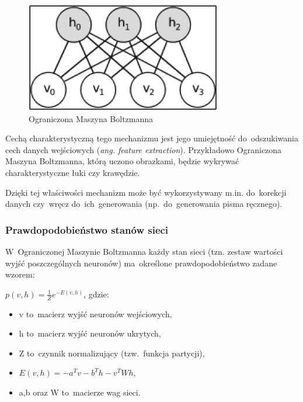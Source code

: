 \begin{figure}
	\centering
	\includegraphics[width=0.75\linewidth]{img/RBM.png}
	\caption{Ograniczona Maszyna Boltzmanna}
\end{figure}

Cechą charakterystyczną tego mechanizmu jest jego umiejętność do~odszukiwania cech danych wejściowych
(\textit{ang. feature extraction}). Przykładowo Ograniczona Maszyna Boltzmanna, którą uczono obrazkami, będzie
wykrywać charakterystyczne łuki czy krawędzie.

Dzięki tej właściwości mechanizm może być wykorzystywany m.in. do~korekcji danych czy~wręcz do~ich~generowania
(np.~do~generowania pisma ręcznego).

\subsubsection{Prawdopodobieństwo stanów sieci}
W~Ograniczonej Maszynie Boltzmanna każdy stan sieci (tzn. zestaw wartości wyjść poszczególnych neuronów)
ma~określone prawdopodobieństwo zadane wzorem:

$p(v,h)=\frac{1}{Z}e^{-E(v,h)}$, gdzie:
\begin{itemize}
  \item v to~macierz wyjść neuronów wejściowych,
  \item h to~macierz wyjść neuronów ukrytych,
  \item Z to~czynnik normalizujący (tzw.~funkcja partycji),
  \item $E(v,h)=-a^{T}v-b^{T}h-v^{T}Wh$,
  \item a,b oraz W to~macierze wag sieci.
\end{itemize}

